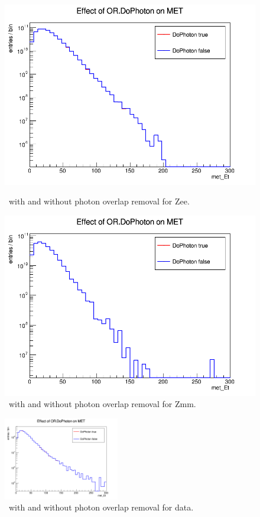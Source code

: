 \begin{figure}[htbp]
\centering
\begin{minipage}{0.45\textwidth}
    \includegraphics[width=\textwidth]{Images/SUSY/ORDoPhoton_Zee.png}
    \caption{\MET\ with and without photon overlap removal for Zee.}
    \label{fig:ORPhoton_first}
\end{minipage}
\hfill
\begin{minipage}{0.45\textwidth}
    \includegraphics[width=\textwidth]{Images/SUSY/ORDoPhoton_Zmm.png}
    \caption{\MET\ with and without photon overlap removal for Zmm.}
\end{minipage}
\end{figure}

\begin{figure}[htbp]
    \centering
    \includegraphics[width=0.45\textwidth]{Images/SUSY/ORDoPhoton_data.png}
    \caption{\MET\ with and without photon overlap removal for data.}
    \label{fig:ORPhoton_last}
\end{figure}